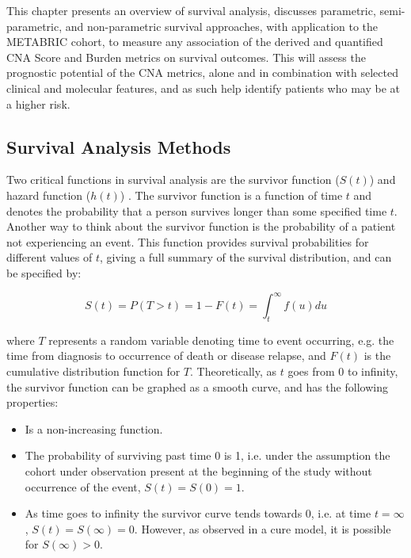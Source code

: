 This chapter presents an overview of survival analysis, discusses parametric, semi-parametric, and non-parametric survival approaches, with application to the METABRIC cohort, to measure any association of the derived and quantified CNA Score and Burden metrics on survival outcomes. This will assess the prognostic potential of the CNA metrics, alone and in combination with selected clinical and molecular features, and as such help identify patients who may be at a higher risk.

\subsection{Survival Analysis Methods}
Two critical functions in survival analysis are the survivor function ($S(t)$) and hazard function ($h(t)$) \citep{kleinbaum_klein_2012}. The survivor function is a function of time $t$ and denotes the probability that a person survives longer than some specified time $t$. Another way to think about the survivor function is the probability of a patient not experiencing an event. This function provides survival probabilities for different values of $t$, giving a full summary of the survival distribution, and can be specified by: 

\begin{equation}
S(t) = P(T > t) = 1-F(t) = \int_t^\infty f(u) du
\label{eq:EQ1}
\end{equation}

where $T$ represents a random variable denoting time to event occurring, e.g. the time from diagnosis to occurrence of death or disease relapse, and $F(t)$ is the cumulative distribution function for $T$. Theoretically, as $t$ goes from 0 to infinity, the survivor function can be graphed as a smooth curve, and has the following properties:   

\begin{itemize}
\item Is a non-increasing function.    

\item The probability of surviving past time 0 is 1, i.e. under the assumption the cohort under observation present at the beginning of the study without occurrence of the event, $S(t) = S(0) = 1$. 

\item As time goes to infinity the survivor curve tends towards 0, i.e. at time $t = \infty$,  $S(t) = S(\infty) = 0$. However, as observed in a cure model, it is possible for $S(\infty) > 0$.   
\end{itemize}

